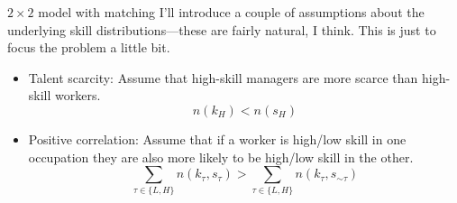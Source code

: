 \documentclass[aspectratio=169]{beamer}
\begin{document}
\begin{frame}{$2\times 2$ model with matching}
		 I'll introduce a couple of assumptions about the underlying skill distributions---these are fairly natural, I think. This is just to focus the problem a little bit.
 
 		\bigskip
 
		\begin{itemize}
			\item Talent scarcity: Assume that high-skill managers are more scarce than high-skill workers.
			\begin{equation*}
				n(k_H) < n(s_H)
			\end{equation*}
			\item Positive correlation: Assume that if a worker is high/low skill in one occupation they are also more likely to be high/low skill in the other.
			\begin{equation*}
				\sum_{\tau \in \{L,H\}}n(k_\tau,s_\tau) > \sum_{\tau \in \{L,H\}}n(k_\tau,s_{\sim\tau})
			\end{equation*}
		\end{itemize}

\end{frame}
\end{document}
